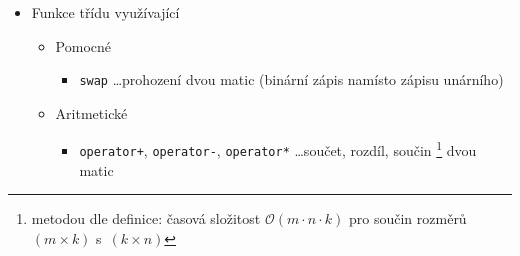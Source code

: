 \documentclass[11pt,a4paper]{article}
\begin{document}
\begin{itemize}
\begin{itemize}
\begin{itemize}
      \item \verb=end=, \verb=cend= \ldots konec se nachází
        \emph{za\/}\thinspace%
        \footnote{obdobně jako u všech iterátorů}
        ~prvkem pravého dolního rohu matice
      \item \verb~operator==~, \verb~operator!=~ \ldots porovnání matic: stejné
        rozměry + stejné těleso + prvek po prvku
      \item \verb~swap~ \ldots prohození dvou matic (včetně rozměrů a těles)
      \item \verb~size~, \verb~max_size~ \ldots počet prvků matice (podle
        \verb~_values~)
      \item \verb~empty~ \ldots prázdná matice (\verb=begin= a \verb=end=
        splývají)
      \item \verb~mul_by_scal~ \ldots vynásobení každého prvku matice skalárem
      \item \verb~transpose~ \ldots vrací novou matici jako transposici původní
      \item \verb~subblock~ \ldots vrací souvislou podmatici (při zadání levého
        horního a pravého dolní rohu požadovaného obdélníku)
      \item \verb~column~ \ldots vrací sloupcový vektor matice
      \item \verb~round_to_zeroes~ \ldots vrací matici, v níž jsou prvky blízké
        nule na nulu  (pro numerické ustálení
        u~\emph{QR algoritmu\/})
      \item (\verb~LUP~ \ldots \emph{LUP dekomposice\/} stále zbývá
        k~naimplementování)
      \item \verb~QR(SqrMtrx<T> & Q, Matrix & R)~ \ldots vrací \emph{QR
      faktorisaci\/} skrze úpravy referencí na~\verb~Q~ a~\verb~R~.
      \item \verb~operator>>~, \verb~operator<<~ \ldots vstup\thinspace%
        \footnote{zadávají se výška, šířka a samotné prvky matice}
        a výstup z/do~\verb~iostream~ objektu
    \end{itemize}
  \end{itemize}
  \item Funkce třídu využívající
    \begin{itemize}
    \item Pomocné
      \begin{itemize}
      \item \verb~swap~ \ldots prohození dvou matic (binární zápis namísto
        zápisu unárního)
      \end{itemize}
    \item Aritmetické
      \begin{itemize}
      \item \verb~operator+~, \verb~operator-~, \verb~operator*~ \ldots součet,
        rozdíl, součin\thinspace%
        \footnote{metodou dle definice: časová složitost $\mathcal{O}(m \cdot n
        \cdot k)$ pro součin rozměrů $(m \times k)$ s~$(k \times n)$}
        dvou matic
      \end{itemize}
    \end{itemize}
\end{itemize}
\end{document}
